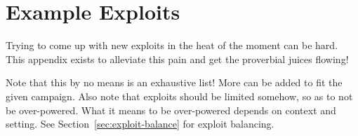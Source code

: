 \chapter{Example Exploits}\label{app:exploits}
Trying to come up with new exploits in the heat of the moment can be hard.
This appendix exists to alleviate this pain and get the proverbial juices flowing!

Note that this by no means is an exhaustive list!
More can be added to fit the given campaign.
Also note that exploits should be limited somehow, so as to not be over-powered. What it means to be over-powered depends on context and setting. See Section~\ref{sec:exploit-balance} for exploit balancing.





